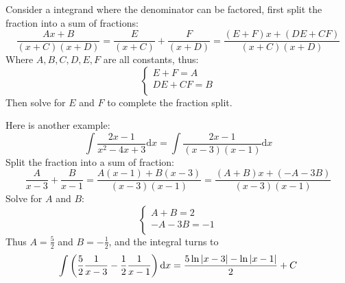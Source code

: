 \documentclass{article}
\numberwithin{equation}{section}
\begin{document}
Consider a integrand where the denominator can be factored, first split the fraction into a sum of fractions:
\[
\frac{Ax + B}{(x + C)(x + D)} = \frac{E}{(x + C)} + \frac{F}{(x + D)} = \frac{(E + F)x + (DE + CF)}{(x + C)(x + D)}
\]
Where $A, B, C, D, E, F$ are all constants, thus:
\[
\begin{cases}
    E + F = A\\
    DE + CF = B\\
\end{cases}
\]
Then solve for $E$ and $F$ to complete the fraction split.

Here is another example:
\[
\int \frac{2x - 1}{x^2 - 4x + 3} \mathrm{d}x = \int \frac{2x - 1}{(x - 3)(x - 1)} \mathrm{d}x
\]
Split the fraction into a sum of fraction:
\[
\frac{A}{x - 3} + \frac{B}{x - 1} = \frac{A(x - 1) + B(x - 3)}{(x - 3)(x - 1)} = \frac{(A+B)x +(-A -3B)}{(x-3)(x-1)}
\]
Solve for $A$ and $B$:
\[
\begin{cases}
    A+B = 2\\
    -A-3B = -1\\
\end{cases}
\]
Thus $A = \frac{5}{2}$ and $B = -\frac{1}{2}$, and the integral turns to 
\[
\int \left(\frac{5}{2}\frac{1}{x-3} - \frac{1}{2}\frac{1}{x-1} \right) \mathrm{d}x = \frac{5\ln \abs{x-3} - \ln \abs{x-1}}{2} + C
\]

\newpage
\end{document}
